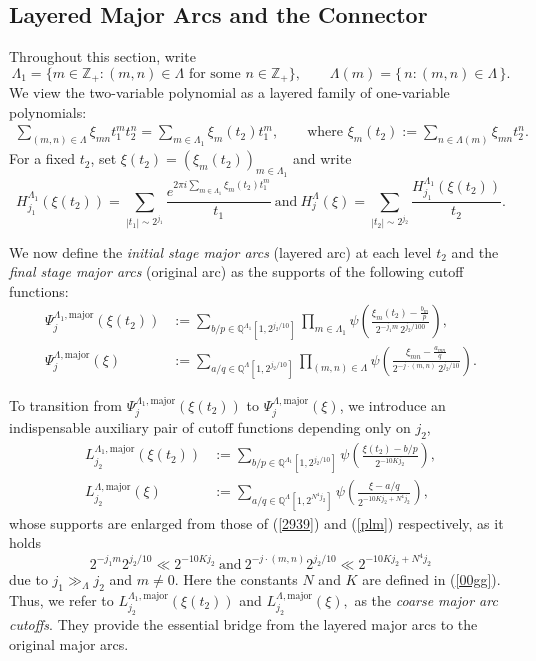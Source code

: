 \documentclass[11 pt,letterpaper]{amsart}
\theoremstyle{plain}
\theoremstyle{definition}
\theoremstyle{remark} \theoremstyle{exam} \theoremstyle{ob}
\numberwithin{equation}{section}
\begin{document}
\subsection{Layered Major Arcs and the Connector}\label{sec35}
Throughout this section,  write
\[
\Lambda_{1} = \{ m \in \mathbb{Z}_+ : (m,n) \in \Lambda \text{ for some } n\in\mathbb{Z}_{+} \},
\qquad
\Lambda(m) = \{\, n : (m,n) \in \Lambda \,\}.
\]
We view the two-variable  polynomial as a layered family of one-variable polynomials:
\begin{align}\label{t00}
	\sum_{(m,n)\in \Lambda}\xi_{mn}t_1^m t_2^n
	= \sum_{m\in \Lambda_1}  \xi_{m}(t_2)t_1^m,
	\qquad 
	\text{where } 
	\xi_m(t_2) := \sum_{n\in \Lambda(m)} \xi_{mn}t_2^n.
\end{align}
For a fixed $t_2$, set $\xi(t_2) = (\xi_m(t_2))_{m\in \Lambda_1}$ and write
\[
H^{\Lambda_1}_{j_1}(\xi(t_2))
  = \sum_{|t_1|\sim 2^{j_1}}
    \frac{e^{2\pi i \sum_{m\in \Lambda_1}\xi_m(t_2)t_1^m}}{t_1}
\ \text{and} \ 
H^{\Lambda}_j(\xi)
  = \sum_{|t_2|\sim 2^{j_2}}\frac{H^{\Lambda_1}_{j_1}(\xi(t_2))}{t_2}.
\]


We now define the \emph{initial stage major arcs} (layered arc) at each level $t_2$ and the \emph{final stage major arcs} (original arc) as the supports of the following cutoff functions:
\begin{align}
\Psi_{j}^{\Lambda_1,\mathrm{major}}(\xi(t_2))
  &:= \sum_{b/p\in \mathbb{Q}^{\Lambda_1}[1,2^{j_2/10}]}
      \prod_{m\in \Lambda_1}
      \psi\!\left(
        \frac{\xi_m(t_2)-\frac{b_m}{p}}
             {2^{-j_1 m}\,2^{j_2/100}}
      \right), \label{2939}\\[4pt]
\Psi_j^{\Lambda,\mathrm{major}}(\xi)
  &:= \sum_{a/q\in \mathbb{Q}^{\Lambda}[1,2^{j_2/10}]}
      \prod_{(m,n)\in \Lambda}
      \psi\!\left(
        \frac{\xi_{mn}-\frac{a_{mn}}{q}}
             {2^{-j\cdot (m,n)}\,2^{j_2/10}}
      \right). \label{plm}
\end{align}


To transition from 
$\Psi_j^{\Lambda_1,\mathrm{major}}(\xi(t_2))$
to 
$\Psi_j^{\Lambda,\mathrm{major}}(\xi)$, 
we introduce  an indispensable auxiliary pair of cutoff functions depending only on $j_2$,
\begin{align}\label{ccnn}
L^{\Lambda_1,\mathrm{major}}_{j_2}(\xi(t_2)) &:=\sum_{b/p\in \mathbb{Q}^{\Lambda_1}[1,2^{j_2/10}]  }  \psi\left(\frac{\xi(t_2)-b/p}{2^{- 10 Kj_2}}\right),\\
L^{\Lambda,\mathrm{major}}_{j_2}(\xi)&
  := \sum_{a/q\in \mathbb{Q}^{\Lambda}[1,2^{N^4 j_2}]}
     \psi\!\left(
       \frac{\xi - a/q}{2^{- 10K j_2 + N^4 j_2}}
     \right),\nonumber
\end{align} 
whose supports are enlarged from those of (\ref{2939}) and (\ref{plm}) respectively, as it holds  
$$2^{-j_1m}2^{j_2/10}\ll  2^{- 10 Kj_2} \ \text{and}\  2^{-j\cdot (m,n)}2^{j_2/10}\ll  2^{- 10Kj_2+N^4j_2}$$
due to $j_1\gg_{\Lambda}j_2$ and $m\ne 0$.
 Here the constants $N$ and $K$ are defined in 
(\ref{00gg}).
Thus, we refer to $L^{\Lambda_1,\mathrm{major}}_{j_2}(\xi(t_2))$ and $L^{\Lambda,\mathrm{major}}_{j_2}(\xi), $   as the \emph{coarse major arc cutoffs}.  They provide the essential bridge from the layered major arcs to the original major arcs.
\end{document}

